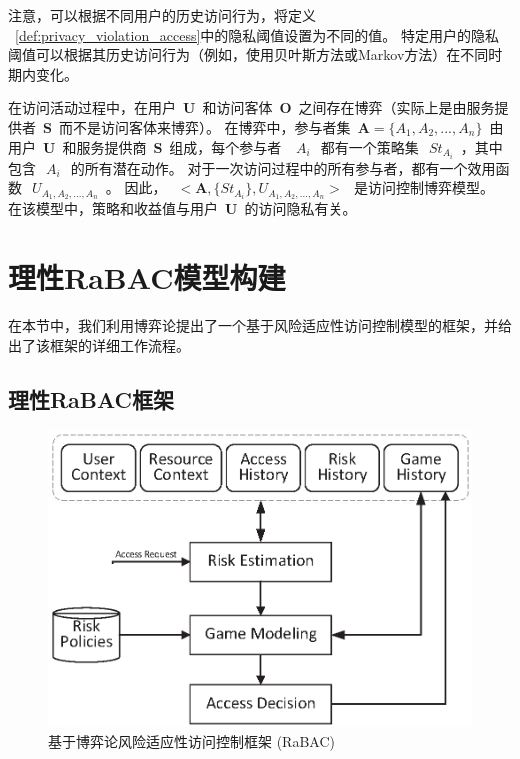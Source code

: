 注意，可以根据不同用户的历史访问行为，将定义 ~\ref{def:privacy_violation_access}中的隐私阈值设置为不同的值。 特定用户的隐私阈值可以根据其历史访问行为（例如，使用贝叶斯方法或Markov方法）在不同时期内变化。

在访问活动过程中，在用户~$\mathbf{U}$~和访问客体~$\mathbf{O}$~之间存在博弈（实际上是由服务提供者~$\mathbf{S}$~而不是访问客体来博弈）。 在博弈中，参与者集~$\mathbf{A}=\{A_1,A_2,...,A_n\}$~由用户~$\mathbf{U}$~和服务提供商~$\mathbf{S}$~组成，每个参与者 ~$~A_i~$~都有一个策略集~$~St_{A_i}$~，其中包含~$~A_i~$~的所有潜在动作。 对于一次访问过程中的所有参与者，都有一个效用函数~$~U_{A_1,A_2,...,A_n}$~。 因此，~$~<\mathbf{A},\{St_{A_i}\},U_{A_1,A_2,...,A_n}>~$~是访问控制博弈模型。 在该模型中，策略和收益值与用户~$\mathbf{U}$~的访问隐私有关。

\section{理性RaBAC模型构建}
\label{sec:framework}


在本节中，我们利用博弈论提出了一个基于风险适应性访问控制模型的框架，并给出了该框架的详细工作流程。
\subsection{理性RaBAC框架}
\label{sec:hlframework}

\begin{figure}[htb]
	\centering
	\includegraphics[width=.85\textwidth]{./figures/game-rbac-framework.eps}
	\caption{基于博弈论风险适应性访问控制框架 (RaBAC)}\label{fig:game-rbac-framework}
\end{figure}



